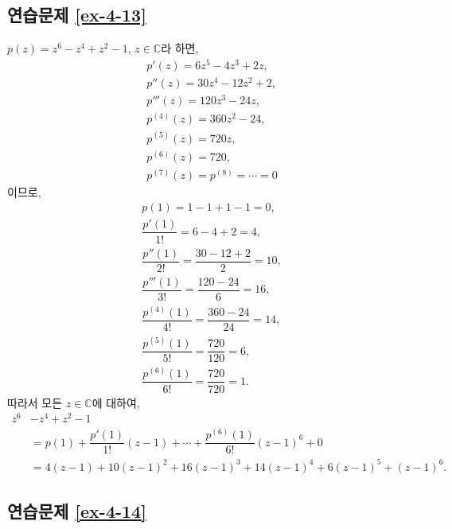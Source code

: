 \subsection*{연습문제 \ref{ex-4-13}}

$p(z) = z^6 -z^4 +z^2 -1$, $z\in \mathbb C$라 하면,
\begin{align*}
& p'(z) = 6z^5 - 4z^3 +2z, \\
& p''(z) = 30z^4 -12z^2 + 2, \\
&p'''(z) = 120z^3 - 24z, \\
&p^{(4)}(z) = 360z^2 - 24, \\
&p^{(5)}(z) = 720z, \\
&p^{(6)}(z) = 720, \\
&p^{(7)}(z) = p^{(8)} = \cdots = 0
\end{align*}
이므로,
\begin{align*}
&p(1) = 1-1+1-1 = 0, \\
&\dfrac{p'(1)}{1!} = 6 - 4 + 2 = 4, \\
&\dfrac{p''(1)}{2!} = \dfrac{30-12+2}{2} = 10, \\
&\dfrac{p'''(1)}{3!} = \dfrac{120-24}{6} = 16, \\
&\dfrac{p^{(4)}(1)}{4!} = \dfrac{360-24}{24} = 14, \\
&\dfrac{p^{(5)}(1)}{5!} = \dfrac{720}{120} = 6, \\
&\dfrac{p^{(6)}(1)}{6!} = \dfrac{720}{720} = 1.
\end{align*}
따라서 모든 $z\in\mathbb C$에 대하여,
\begin{align*}
z^6&-z^4+z^2-1 \\
&= p(1) + \dfrac{p'(1)}{1!}(z-1) + \cdots + \dfrac{p^{(6)}(1)}{6!}(z-1)^6 + 0 \\
&= 4(z-1) + 10(z-1)^2 + 16(z-1)^3 + 14(z-1)^4 + 6(z-1)^5 + (z-1)^6.
\end{align*}

\subsection*{연습문제 \ref{ex-4-14}}

